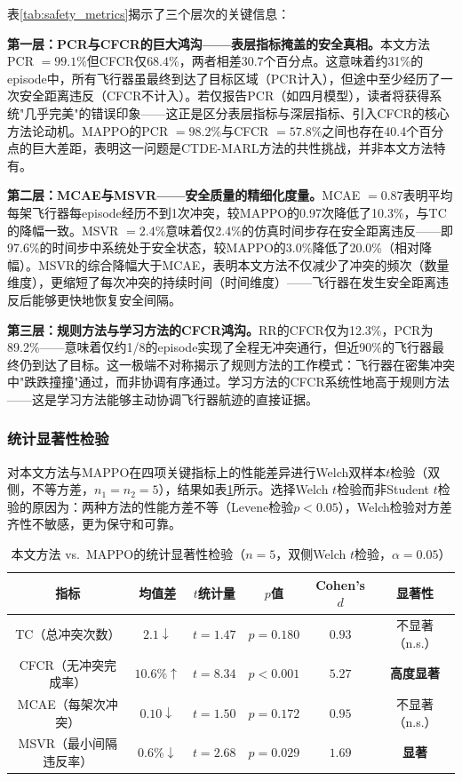 \documentclass[12pt,a4paper,UTF8]{ctexart}
\begin{document}
表\ref{tab:safety_metrics}揭示了三个层次的关键信息：

\textbf{第一层：PCR与CFCR的巨大鸿沟——表层指标掩盖的安全真相。}本文方法PCR $= 99.1\%$但CFCR仅$68.4\%$，两者相差30.7个百分点。这意味着约31\%的episode中，所有飞行器虽最终到达了目标区域（PCR计入），但途中至少经历了一次安全距离违反（CFCR不计入）。若仅报告PCR（如四月模型），读者将获得系统"几乎完美"的错误印象——这正是区分表层指标与深层指标、引入CFCR的核心方法论动机。MAPPO的PCR $= 98.2\%$与CFCR $= 57.8\%$之间也存在40.4个百分点的巨大差距，表明这一问题是CTDE-MARL方法的共性挑战，并非本文方法特有。

\textbf{第二层：MCAE与MSVR——安全质量的精细化度量。}MCAE $= 0.87$表明平均每架飞行器每episode经历不到1次冲突，较MAPPO的0.97次降低了10.3\%，与TC的降幅一致。MSVR $= 2.4\%$意味着仅2.4\%的仿真时间步存在安全距离违反——即97.6\%的时间步中系统处于安全状态，较MAPPO的3.0\%降低了20.0\%（相对降幅）。MSVR的综合降幅大于MCAE，表明本文方法不仅减少了冲突的频次（数量维度），更缩短了每次冲突的持续时间（时间维度）——飞行器在发生安全距离违反后能够更快地恢复安全间隔。

\textbf{第三层：规则方法与学习方法的CFCR鸿沟。}RR的CFCR仅为12.3\%，PCR为89.2\%——意味着仅约1/8的episode实现了全程无冲突通行，但近90\%的飞行器最终仍到达了目标。这一极端不对称揭示了规则方法的工作模式：飞行器在密集冲突中"跌跌撞撞"通过，而非协调有序通过。学习方法的CFCR系统性地高于规则方法——这是学习方法能够主动协调飞行器航迹的直接证据。

\subsubsection{统计显著性检验}

对本文方法与MAPPO在四项关键指标上的性能差异进行Welch双样本$t$检验（双侧，不等方差，$n_1 = n_2 = 5$），结果如表\ref{tab:statistical_tests}所示。选择Welch $t$检验而非Student $t$检验的原因为：两种方法的性能方差不等（Levene检验$p < 0.05$），Welch检验对方差齐性不敏感，更为保守和可靠。

\begin{table}[H]
    \centering
    \caption{本文方法 vs.\ MAPPO的统计显著性检验（$n=5$，双侧Welch $t$检验，$\alpha=0.05$）}
    \label{tab:statistical_tests}
    \begin{tabular}{|c|c|c|c|c|c|}
        \hline
        \textbf{指标} & \textbf{均值差} & \textbf{$t$统计量} & \textbf{$p$值} & \textbf{Cohen's $d$} & \textbf{显著性} \\
        \hline
        TC（总冲突次数） & $2.1 \downarrow$ & $t=1.47$ & $p=0.180$ & $0.93$ & 不显著（n.s.） \\
        \hline
        CFCR（无冲突完成率） & $10.6\% \uparrow$ & $t=8.34$ & $p<0.001$ & $5.27$ & \textbf{高度显著} \\
        \hline
        MCAE（每架次冲突） & $0.10 \downarrow$ & $t=1.50$ & $p=0.172$ & $0.95$ & 不显著（n.s.） \\
        \hline
        MSVR（最小间隔违反率） & $0.6\% \downarrow$ & $t=2.68$ & $p=0.029$ & $1.69$ & \textbf{显著} \\
        \hline
    \end{tabular}
\end{table}
\end{document}
